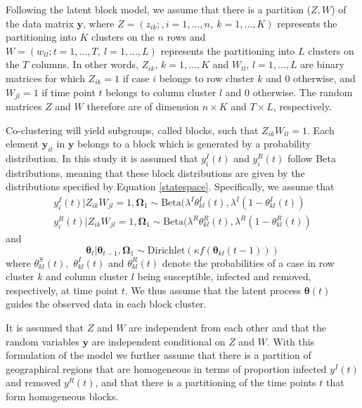 \documentclass[10pt,a4paper]{article}
\begin{document}
Following the latent block model, we assume that there is a partition ($Z, W$) of the data matrix $\mathbf{y}$, where $Z = (z_{ik}; , i=1,\ldots, n, \: k = 1,\ldots, K)$ represents the partitioning into $K$ clusters on the $n$ rows and $W = (w_{tl}; t=1,\ldots, T, \: l=1,\ldots, L)$ represents the partitioning into $L$ clusters on the $T$ columns. In other words, $Z_{ik}$, $k = 1,..., K$ and $W_{tl}$, $l = 1,..., L$ are binary matrices for which $Z_{ik} = 1$ if case $i$ belongs to row cluster $k$ and $0$ otherwise, and $W_{jl} = 1$ if time point $t$ belongs to column cluster $l$ and $0$ otherwise. The random matrices $Z$ and $W$ therefore are of dimension $n \times K$ and $T \times L$, respectively. 

Co-clustering will yield subgroups, called blocks, such that $Z_{ik} W_{tl} = 1$. Each element $\mathbf{y}_{it}$ in $\mathbf{y}$ belongs to a block which is generated by a probability distribution. In this study it is assumed that $y_{i}^I(t)$ and $y_{i}^R(t)$ follow Beta distributions, meaning that these block distributions are given by the distributions specified by Equation \ref{statespace}. Specifically, we assume that 
%
\begin{equation}\label{statespace-observed}
	\begin{aligned}
		y_{i}^I(t) | Z_{ik}W_{jl} = 1, \boldsymbol{\Omega}_1 \sim \text{Beta}(\lambda^I \theta_{kl}^I(t), \lambda^I(1 - \theta_{kl}^I(t)) \\
		y_{i}^R(t) | Z_{ik}W_{jl} = 1, \boldsymbol{\Omega}_1 \sim \text{Beta}(\lambda^R \theta_{kl}^R(t), \lambda^R(1 - \theta_{kl}^R(t))
	\end{aligned}
\end{equation}
% 
and 
%
\begin{equation}\label{statespace-latent}
	\boldsymbol{\theta}_t | \boldsymbol{\theta}_{t-1}, \boldsymbol{\Omega}_1 \sim \text{Dirichlet}(\kappa f(\boldsymbol{\theta}_{kl}(t-1)))
\end{equation}
%
where 
%
$
\theta_{kl}^S(t),
$ 
%
$
\theta_{kl}^I(t)
$
%
and 
%
$
\theta_{kl}^R(t)
$
%
denote the probabilities of a case in row cluster $k$ and column cluster $l$ being susceptible, infected and removed, respectively, at time point $t$. We thus assume that the latent process $\boldsymbol{\theta}(t)$ guides the observed data in each block cluster. 

It is assumed that $Z$ and $W$ are independent from each other and that the random variables $\mathbf{y}$ are independent conditional on $Z$ and $W$. With this formulation of the model we further assume that there is a partition of geographical regions that are homogeneous in terms of proportion infected $y^I(t)$ and removed $y^R(t)$, and that there is a partitioning of the time points $t$ that form homogeneous blocks.
\end{document}
